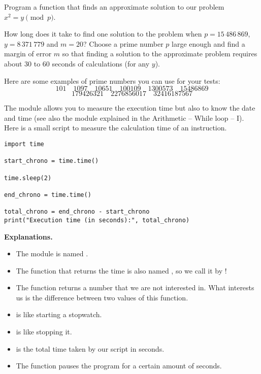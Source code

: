 \documentclass[11pt,class=report,crop=false]{standalone}
\begin{document}
\begin{activite}
\begin{enumerate}
	Program a function  that finds an approximate solution to our problem $x^2 = y \pmod{p}$.
	
	How long does it take to find one solution to the problem when $p = 15\,486\,869$, $y = 8\,371\,779$ and $m=20$?
	Choose a prime number $p$ large enough and find a margin of error $m$ so that finding a solution to the approximate problem requires about 30 to 60 seconds of calculations (for any $y$).

\end{enumerate}
  

Here are some examples of prime numbers you can use for your tests:
$$101 \quad
1097 \quad
10651 \quad
100109 \quad
1300573 \quad
15486869$$
$$179426321 \quad  
2276856017 \quad 
32416187567$$
\end{activite}




\begin{cours}[Stopwatch]


The  module allows you to measure the execution time but also to know the date and time (see also the  module explained in the \og{}Arithmetic -- While loop -- I\fg{}).
Here is a small script to measure the calculation time of an instruction. 

\begin{lstlisting}
import time

start_chrono = time.time()

time.sleep(2)

end_chrono = time.time()

total_chrono = end_chrono - start_chrono
print("Execution time (in seconds):", total_chrono)
\end{lstlisting}


\textbf{Explanations.}
\begin{itemize}
  \item The module is named .
  \item The function that returns the time is also named , so we call it by !
  \item The function  returns a number that we are not interested in. What interests us is the difference between two values of this function. 
  \item {} is like starting a stopwatch.
  \item {} is like stopping it.
  \item {} is the total time taken by our script in seconds.
  \item The  function pauses the program for a certain amount of seconds.
\end{itemize}
\end{cours}
\end{document}
